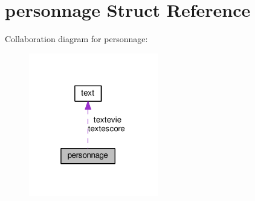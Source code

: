 \hypertarget{structpersonnage}{}\section{personnage Struct Reference}
\label{structpersonnage}


Collaboration diagram for personnage\+:\nopagebreak
\begin{figure}[H]
\begin{center}
\leavevmode
\includegraphics[width=160pt]{structpersonnage__coll__graph}
\end{center}
\end{figure}
